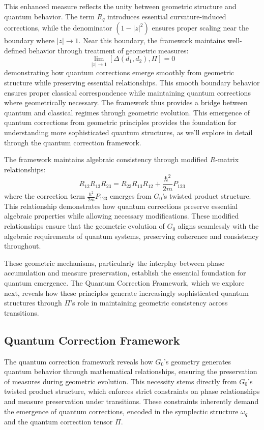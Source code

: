 \documentclass[10pt]{article}
\begin{document}
This enhanced measure reflects the unity between geometric structure and quantum behavior. The term $R_q$ introduces essential curvature-induced corrections, while the denominator $(1 - |z|^2)$ ensures proper scaling near the boundary where $|z| \to 1$. Near this boundary, the framework maintains well-defined behavior through treatment of geometric measures:
\[
\lim_{|z| \to 1} [\Delta(d_1,d_2), \Pi] = 0
\]
demonstrating how quantum corrections emerge smoothly from geometric structure while preserving essential relationships. This smooth boundary behavior ensures proper classical correspondence while maintaining quantum corrections where geometrically necessary. The framework thus provides a bridge between quantum and classical regimes through geometric evolution. This emergence of quantum corrections from geometric principles provides the foundation for understanding more sophisticated quantum structures, as we'll explore in detail through the quantum correction framework.

The framework maintains algebraic consistency through modified $R$-matrix relationships:
\[
R_{12}R_{13}R_{23} = R_{23}R_{13}R_{12} + \frac{\hbar^2}{2m}P_{123}
\]
where the correction term $\frac{\hbar^2}{2m}P_{123}$ emerges from $G_0$'s twisted product structure. This relationship demonstrates how quantum corrections preserve essential algebraic properties while allowing necessary modifications. These modified relationships ensure that the geometric evolution of $G_0$ aligns seamlessly with the algebraic requirements of quantum systems, preserving coherence and consistency throughout.

These geometric mechanisms, particularly the interplay between phase accumulation and measure preservation, establish the essential foundation for quantum emergence. The Quantum Correction Framework, which we explore next, reveals how these principles generate increasingly sophisticated quantum structures through $\Pi$'s role in maintaining geometric consistency across transitions.

\subsection{Quantum Correction Framework}

The quantum correction framework reveals how $G_0$'s geometry generates quantum behavior through mathematical relationships, ensuring the preservation of measures during geometric evolution. This necessity stems directly from $G_0$'s twisted product structure, which enforces strict constraints on phase relationships and measure preservation under transitions. These constraints inherently demand the emergence of quantum corrections, encoded in the symplectic structure $\omega_q$ and the quantum correction tensor $\Pi$.
\end{document}
